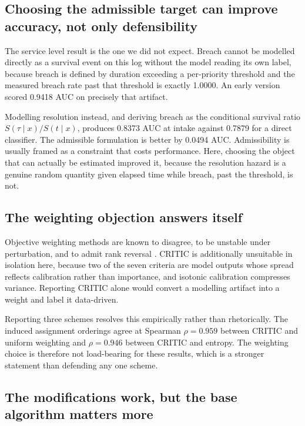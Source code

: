 \subsection{Choosing the admissible target can improve accuracy, not only defensibility}

The service level result is the one we did not expect. Breach cannot be modelled directly as
a survival event on this log without the model reading its own label, because breach is
defined by duration exceeding a per-priority threshold and the measured breach rate past that
threshold is exactly \num{1.0000}. An early version scored \num{0.9418} AUC on precisely that
artifact.

Modelling resolution instead, and deriving breach as the conditional survival ratio
$S(\tau \mid x) / S(t \mid x)$, produces \num{0.8373} AUC at intake against \num{0.7879} for a
direct classifier. The admissible formulation is better by \num{0.0494} AUC. Admissibility is
usually framed as a constraint that costs performance. Here, choosing the object that can
actually be estimated improved it, because the resolution hazard is a genuine random quantity
given elapsed time while breach, past the threshold, is not.

\subsection{The weighting objection answers itself}

Objective weighting methods are known to disagree, to be unstable under perturbation, and to
admit rank reversal \citep{mukhametzyanov2021specific,linh2025evaluating,li2026trend}. CRITIC
is additionally unsuitable in isolation here, because two of the seven criteria are model
outputs whose spread reflects calibration rather than importance, and isotonic calibration
compresses variance. Reporting CRITIC alone would convert a modelling artifact into a weight
and label it data-driven.

Reporting three schemes resolves this empirically rather than rhetorically. The induced
assignment orderings agree at Spearman $\rho = \num{0.959}$ between CRITIC and uniform
weighting and $\rho = \num{0.946}$ between CRITIC and entropy. The weighting choice is
therefore not load-bearing for these results, which is a stronger statement than defending any
one scheme.

\subsection{The modifications work, but the base algorithm matters more}

